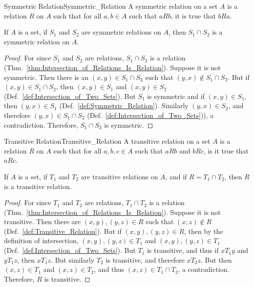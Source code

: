     \begin{fdefinition}{Symmetric Relation}{Symmetric_Relation}
        A symmetric relation on a set $A$ is a
        relation $R$ on $A$ such that for all $a,b\in{A}$
        such that $aRb$, it is true that $bRa$.
    \end{fdefinition}
    \begin{theorem}
        If $A$ is a set, if $S_{1}$ and $S_{2}$ are symmetric relations
        on $A$, then $S_{1}\cap{S}_{2}$ is a symmetric relation on $A$.
    \end{theorem}
    \begin{proof}
        For since $S_{1}$ and $S_{2}$ are relations, $S_{1}\cap{S}_{2}$ is a
        relation (Thm.~\ref{thm:Intersection_of_Relations_Is_Relation}). Suppose
        it is not symmetric. Then there is an $(x,y)\in{S}_{1}\cap{S}_{2}$ such
        that $(y,x)\notin{S}_{1}\cap{S}_{2}$. But if
        $(x,y)\in{S}_{1}\cap{S}_{2}$, then $(x,y)\in{S}_{1}$ and
        $(x,y)\in{S}_{2}$ (Def.~\ref{def:Intersection_of_Two_Sets}). But $S_{1}$
        is symmetric and if $(x,y)\in{S}_{1}$, then $(y,x)\in{S}_{1}$
        (Def.~\ref{def:Symmetric_Relation}). Similarly $(y,x)\in{S}_{2}$, and
        therefore $(y,x)\in{S}_{1}\cap{S}_{2}$
        (Def.~\ref{def:Intersection_of_Two_Sets})), a contradiction. Therefore,
        $S_{1}\cap{S}_{2}$ is symmetric.
    \end{proof}
    \begin{fdefinition}{Transitive Relation}{Transitive_Relation}
        A transitive relation on a set $A$ is a relation $R$ on $A$
        such that for all $a,b,c\in{A}$ such that $aRb$ and $bRc$,
        is it true that $aRc$.
    \end{fdefinition}
    \begin{theorem}
        If $A$ is a set, if $T_{1}$ and $T_{2}$ are transitive relations on $A$,
        and if $R=T_{1}\cap{T}_{2}$, then $R$ is a transitive relation.
    \end{theorem}
    \begin{proof}
        For since $T_{1}$ and $T_{2}$ are relations, $T_{1}\cap{T}_{2}$ is a
        relation (Thm.~\ref{thm:Intersection_of_Relations_Is_Relation}). Suppose
        it is not transitive. Then there are $(x,y),(y,z)\in{R}$ such that
        $(x,z)\notin{R}$ (Def.~\ref{def:Transitive_Relation}). But if
        $(x,y),(y,z)\in{R}$, then by the definition of intersection,
        $(x,y),(y,z)\in{T}_{1}$ and $(x,y),(y,z)\in{T}_{1}$
        (Def.~\ref{def:Intersection_of_Two_Sets}). But $T_{1}$ is transitive, and
        thus if $xT_{1}y$ and $yT_{1}z$, then $xT_{1}z$. But similarly $T_{2}$
        is transitive, and therefore $xT_{2}z$. But then $(x,z)\in{T}_{1}$ and
        $(x,z)\in{T}_{2}$, and thus $(x,z)\in{T}_{1}\cap{T}_{2}$, a
        contradiction. Therefore, $R$ is transitive.
    \end{proof}
